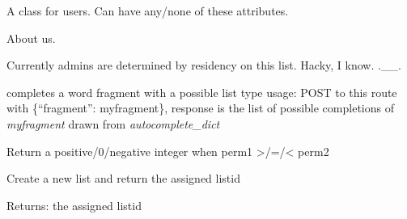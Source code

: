 \documentclass[letterpaper,10pt,english]{sphinxmanual}
\begin{document}

\begin{fulllineitems}
\label{index:routes.User}
A class for users. Can have any/none of these attributes.

\end{fulllineitems}


\begin{fulllineitems}
\label{index:routes.about}
About us.

\end{fulllineitems}


\begin{fulllineitems}
\label{index:routes.admin_unames}
Currently admins are determined by residency on this list.
Hacky, I know. .\_\_.

\end{fulllineitems}


\begin{fulllineitems}
\label{index:routes.autocomplete}
completes a word fragment with a possible list type
usage: POST to this route with \{``fragment'': myfragment\},
response is the list of possible completions of \emph{myfragment}
drawn from \emph{autocomplete\_dict}

\end{fulllineitems}


\begin{fulllineitems}
\label{index:routes.cmp_permission}
Return a positive/0/negative integer when perm1 \textgreater{}/=/\textless{} perm2

\end{fulllineitems}


\begin{fulllineitems}
\label{index:routes.create_list}
Create a new list and return the assigned listid

Returns: the assigned listid

\end{fulllineitems}
\end{document}
